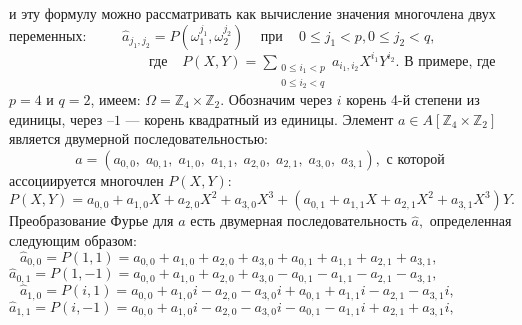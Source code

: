 \documentclass{../../template/mai_book}
\begin{document}
и эту формулу можно рассматривать как вычисление значения многочлена двух переменных: \newline \newline \indent
$\;\;\;\;\;\;\;\;\hat a_{j_1 , j_2} = P(\omega_1^{j_1},\omega_2^{j_2})\;\;\;$ при $\;\;\; 0 \le j_1 < p, 0 \le j_2 < q,$ \newline \newline \indent
$\;\;\;\;\;\;\;\;\;\;\;\;\;\;\;\;\;\;\;\;\;\;\;\;\;\;\;\;\;\;\;\;\;\;\;\;$где $\;\;\,P(X,Y) = \sum \limits_{\substack{0 \le i_1 < p \\ 0 \le i_2 < q}}a_{i_1 , i_2}X^{i_1}Y^{i_2}$. \newline \newline 
В примере, где $p = 4$ и $q = 2$, имеем: $\Omega = \mathds{Z}_4 \times \mathds{Z}_2.$ Обозначим через $i$ корень 4-й степени из единицы, через --$1$ --- корень квадратный из единицы. Элемент $a \in A[\mathds{Z}_4 \times \mathds{Z}_2]$ является двумерной последовательностью: \newline \newline \indent
$\;\;\;\;\;\;\;\;\;\;\;\;\;\;\;\;\;a = (a_{0,0},\;a_{0,1},\;a_{1,0},\;a_{1,1},\;a_{2,0},\;a_{2,1},\;a_{3,0},\;a_{3,1}),$ \newline \newline
с которой ассоциируется многочлен $P(X,Y):$ \newline \newline 
$P(X,Y) = a_{0,0} + a_{1,0}X + a_{2,0}X^2 + a_{3,0}X^3 + (a_{0,1} + a_{1,1}X + a_{2,1}X^2 + a_{3,1}X^3)Y.$ \newline \newline
Преобразование Фурье для $a$ есть двумерная последовательность $\hat a,$
\newpage
\noindent
определенная следующим образом: \newline \newline \indent
$\;\;\:\hat a_{0,0} = P(1,1) = a_{0,0} + a_{1,0} + a_{2,0} + a_{3,0} + a_{0,1} + a_{1,1} + a_{2,1} + a_{3,1},$ \newline \indent
$\hat a_{0,1} = P(1,-1) = a_{0,0} + a_{1,0} + a_{2,0} + a_{3,0} - a_{0,1} - a_{1,1} - a_{2,1} - a_{3,1},$ \newline \indent
$\;\;\:\hat a_{1,0} = P(i,1) = a_{0,0} + a_{1,0}i - a_{2,0} - a_{3,0}i + a_{0,1} + a_{1,1}i - a_{2,1} - a_{3,1}i,$ \newline \indent
$\hat a_{1,1} = P(i,-1) = a_{0,0} + a_{1,0}i - a_{2,0} - a_{3,0}i - a_{0,1} - a_{1,1}i + a_{2,1} + a_{3,1}i,$ \newline \indent
\end{document}
